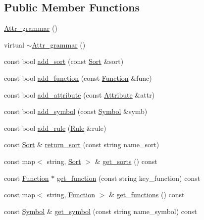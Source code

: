 \subsection*{Public Member Functions}
\begin{DoxyCompactItemize}
\item 
\hyperlink{classgenevalmag_1_1Attr__grammar_a4163922d72d60143cd36008ab7f7abce}{Attr\_\-grammar} ()
\item 
virtual \hyperlink{classgenevalmag_1_1Attr__grammar_a4655bdc8253f4d480fd68441363a3cd0}{$\sim$Attr\_\-grammar} ()
\item 
const bool \hyperlink{classgenevalmag_1_1Attr__grammar_aaa4b67f68b6cdcf70ed5876b63343db7}{add\_\-sort} (const \hyperlink{classgenevalmag_1_1Sort}{Sort} \&sort)
\item 
const bool \hyperlink{classgenevalmag_1_1Attr__grammar_a2dc3357532cdef0dd92eaf3f55ca2ec2}{add\_\-function} (const \hyperlink{classgenevalmag_1_1Function}{Function} \&func)
\item 
const bool \hyperlink{classgenevalmag_1_1Attr__grammar_a4ccf3523a20ea3e646942af93a9df7e2}{add\_\-attribute} (const \hyperlink{classgenevalmag_1_1Attribute}{Attribute} \&attr)
\item 
const bool \hyperlink{classgenevalmag_1_1Attr__grammar_a66644b6cede73b6dcbdc7b6b7ef8826d}{add\_\-symbol} (const \hyperlink{classgenevalmag_1_1Symbol}{Symbol} \&symb)
\item 
const bool \hyperlink{classgenevalmag_1_1Attr__grammar_aec81306d22cc26b9d7276b70d30d329b}{add\_\-rule} (\hyperlink{classgenevalmag_1_1Rule}{Rule} \&rule)
\item 
const \hyperlink{classgenevalmag_1_1Sort}{Sort} \& \hyperlink{classgenevalmag_1_1Attr__grammar_acfa0b0a6876e33a4f6ab19afd073edf8}{return\_\-sort} (const string name\_\-sort)
\item 
const map$<$ string, \hyperlink{classgenevalmag_1_1Sort}{Sort} $>$ \& \hyperlink{classgenevalmag_1_1Attr__grammar_a9e56cac2670355a2d93e3cd20afc1c2d}{get\_\-sorts} () const 
\item 
const \hyperlink{classgenevalmag_1_1Function}{Function} $\ast$ \hyperlink{classgenevalmag_1_1Attr__grammar_ae1070b6d532da48fb2d87c40c76cf341}{get\_\-function} (const string key\_\-function) const 
\item 
const map$<$ string, \hyperlink{classgenevalmag_1_1Function}{Function} $>$ \& \hyperlink{classgenevalmag_1_1Attr__grammar_ae9743e35703d55c1d9594d7061340b9b}{get\_\-functions} () const 
\item 
const \hyperlink{classgenevalmag_1_1Symbol}{Symbol} \& \hyperlink{classgenevalmag_1_1Attr__grammar_a09a1044b5f34ae5794d602716b743129}{get\_\-symbol} (const string name\_\-symbol) const 

\end{DoxyCompactItemize}
